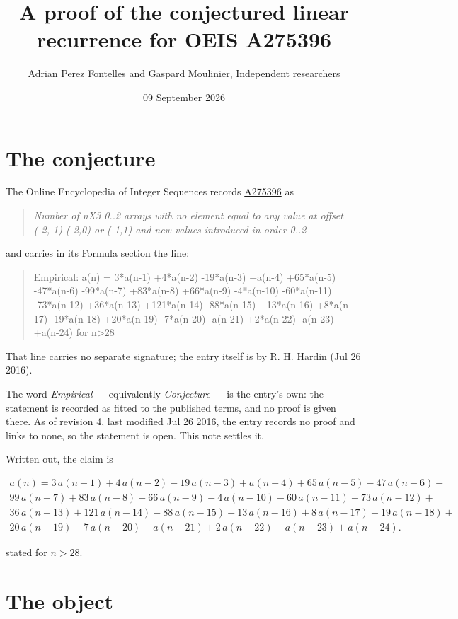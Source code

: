 \documentclass[11pt]{article}
\title{A proof of the conjectured linear recurrence for OEIS A275396}
\author{Adrian Perez Fontelles and Gaspard Moulinier, Independent researchers}
\date{09 September 2026}
\theoremstyle{definition}
\begin{document}
\maketitle
\section{The conjecture}

The Online Encyclopedia of Integer Sequences records \href{https://oeis.org/A275396}{A275396} as

\begin{quote}\itshape Number of nX3 0..2 arrays with no element equal to any value at offset (-2,-1) (-2,0) or (-1,1) and new values introduced in order 0..2\end{quote}

and carries in its Formula section the line:

\begin{quote}\ttfamily Empirical: a(n) = 3*a(n-1) +4*a(n-2) -19*a(n-3) +a(n-4) +65*a(n-5) -47*a(n-6) -99*a(n-7) +83*a(n-8) +66*a(n-9) -4*a(n-10) -60*a(n-11) -73*a(n-12) +36*a(n-13) +121*a(n-14) -88*a(n-15) +13*a(n-16) +8*a(n-17) -19*a(n-18) +20*a(n-19) -7*a(n-20) -a(n-21) +2*a(n-22) -a(n-23) +a(n-24) for n>28\end{quote}

That line carries no separate signature; the entry itself is by R. H. Hardin (Jul 26 2016).

The word {\itshape Empirical} --- equivalently {\itshape Conjecture} --- is the entry's own: the statement is recorded as fitted to the published terms, and no proof is given there. As of revision 4, last modified Jul 26 2016, the entry records no proof and links to none, so the statement is open. This note settles it.

Written out, the claim is

\begin{multline*} a(n) = 3\,a(n-1) + 4\,a(n-2) - 19\,a(n-3) + a(n-4) + 65\,a(n-5) - 47\,a(n-6) - \\ 99\,a(n-7) + 83\,a(n-8) + 66\,a(n-9) - 4\,a(n-10) - 60\,a(n-11) - 73\,a(n-12) + \\ 36\,a(n-13) + 121\,a(n-14) - 88\,a(n-15) + 13\,a(n-16) + 8\,a(n-17) - 19\,a(n-18) + \\ 20\,a(n-19) - 7\,a(n-20) - a(n-21) + 2\,a(n-22) - a(n-23) + a(n-24). \end{multline*}

stated for $n > 28$.

\section{The object}
\end{document}
